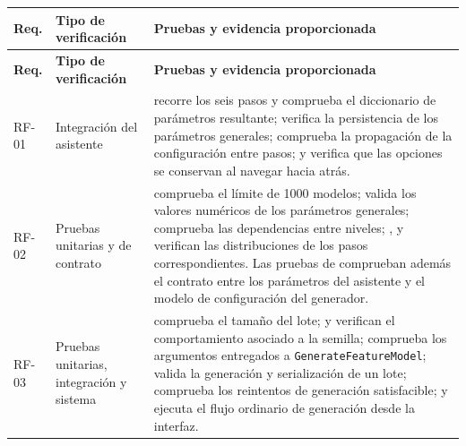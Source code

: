 \begin{longtable}{@{}P{1.3cm} P{2.6cm} P{\dimexpr\textwidth-3.9cm-4\tabcolsep\relax}@{}}

\toprule
\textbf{Req.} &
\textbf{Tipo de verificación} &
\textbf{Pruebas y evidencia proporcionada} \\
\midrule
\endfirsthead

\toprule
\textbf{Req.} &
\textbf{Tipo de verificación} &
\textbf{Pruebas y evidencia proporcionada} \\
\midrule
\endhead

RF-01 &
Integración del asistente &
recorre los seis pasos y comprueba el diccionario de parámetros resultante;
verifica la persistencia de los parámetros generales;
comprueba la propagación de la configuración entre pasos; y
verifica que las opciones se conservan al navegar hacia atrás.
\\[0.9em]

RF-02 &
Pruebas unitarias y de contrato &
comprueba el límite de 1000 modelos;
valida los valores numéricos de los parámetros generales;
comprueba las dependencias entre niveles;
,
y
verifican las distribuciones de los pasos correspondientes. Las pruebas de
 comprueban además el contrato entre los
parámetros del asistente y el modelo de configuración del generador.
\\[0.9em]

RF-03 &
Pruebas unitarias, integración y sistema &
 comprueba el tamaño del lote;
 y
 verifican el
comportamiento asociado a la semilla;
comprueba los argumentos entregados a
\texttt{GenerateFeatureModel};
valida la generación y serialización de un lote;
comprueba los reintentos de generación satisfacible; y
ejecuta el flujo ordinario de generación desde la interfaz.
\\[0.9em]


\end{longtable}
